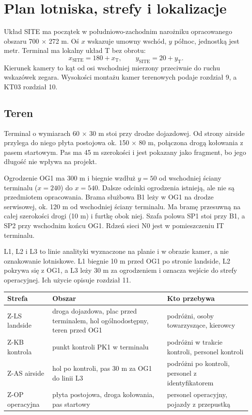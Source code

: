 \section{Plan lotniska, strefy i lokalizacje}

Układ SITE ma początek w południowo-zachodnim narożniku opracowanego obszaru 700 $\times$ 272 m. Oś $x$ wskazuje umowny wschód, $y$ północ, jednostką jest metr. Terminal ma lokalny układ T bez obrotu:
\[
x_{\mathrm{SITE}}=180+x_{\mathrm{T}},\qquad y_{\mathrm{SITE}}=20+y_{\mathrm{T}}.
\]
Kierunek kamery to kąt od osi wschodniej mierzony przeciwnie do ruchu wskazówek zegara. Wysokości montażu kamer terenowych podaje rozdział 9, a KT03 rozdział 10.


\subsection*{Teren}
Terminal o wymiarach 60 $\times$ 30 m stoi przy drodze dojazdowej. Od strony airside przylega do niego płyta postojowa ok. 150 $\times$ 80 m, połączona drogą kołowania z pasem startowym. Pas ma 45 m szerokości i jest pokazany jako fragment, bo jego długość nie wpływa na projekt.

Ogrodzenie OG1 ma 300 m i biegnie wzdłuż $y=50$ od wschodniej ściany terminalu ($x=240$) do $x=540$. Dalsze odcinki ogrodzenia istnieją, ale nie są przedmiotem opracowania. Brama służbowa B1 leży w OG1 na drodze serwisowej, ok. 120 m od wschodniej ściany terminalu. Ma bramę przesuwną na całej szerokości drogi (10 m) i furtkę obok niej. Szafa polowa SP1 stoi przy B1, a SP2 przy wschodnim końcu OG1. Rdzeń sieci N0 jest w pomieszczeniu IT terminalu.

L1, L2 i L3 to linie analityki wyznaczone na planie i w obrazie kamer, a nie oznakowanie lotniskowe. L1 biegnie 10 m przed OG1 po stronie landside, L2 pokrywa się z OG1, a L3 leży 30 m za ogrodzeniem i oznacza wejście do strefy operacyjnej. Ich użycie opisuje rozdział 11.

\begin{center}
\small
\begin{tabularx}{\linewidth}{@{}lYY@{}}
\toprule
Strefa & Obszar & Kto przebywa \\
\midrule
Z-LS landside & droga dojazdowa, plac przed terminalem, hol ogólnodostępny, teren przed OG1 & podróżni, osoby towarzyszące, kierowcy \\
Z-KB kontrola & punkt kontroli PK1 w terminalu & podróżni w trakcie kontroli, personel kontroli \\
Z-AS airside & hol po kontroli, pas 30 m za OG1 do linii L3 & podróżni po kontroli, personel z identyfikatorem \\
Z-OP operacyjna & płyta postojowa, droga kołowania, pas startowy & personel operacyjny, pojazdy z przepustką \\
\bottomrule
\end{tabularx}
\end{center}

